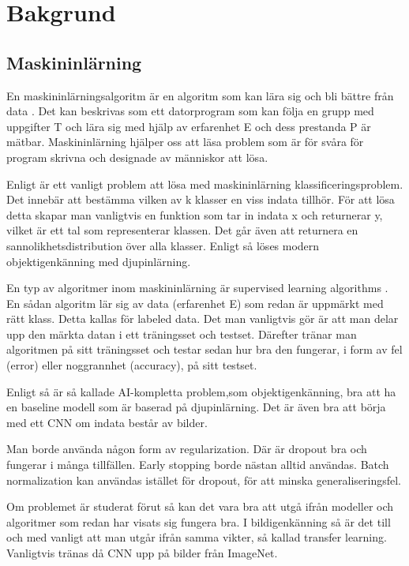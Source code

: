 \documentclass{kththesis}
\begin{document}
\chapter{Bakgrund}
  \section{Maskininlärning}
  En maskininlärningsalgoritm är en algoritm som kan lära sig och bli bättre från data \parencite{Goodfellow-et-al-2016}. Det kan beskrivas som ett datorprogram som kan följa en grupp med uppgifter T och lära sig med hjälp av erfarenhet E och dess prestanda P är mätbar. Maskininlärning hjälper oss att läsa problem som är för svåra för program skrivna och designade av människor att lösa. 

  Enligt \cite{Goodfellow-et-al-2016} är ett vanligt problem att lösa med maskininlärning klassificeringsproblem. Det innebär att bestämma vilken av k klasser en viss indata tillhör. För att lösa detta skapar man vanligtvis en funktion som tar in indata x och returnerar y, vilket är ett tal som representerar klassen. Det går även att returnera en sannolikhetsdistribution över alla klasser. Enligt \cite{Goodfellow-et-al-2016} så löses modern objektigenkänning med djupinlärning.

  En typ av algoritmer inom maskininlärning är supervised learning algorithms \parencite{Goodfellow-et-al-2016}. En sådan algoritm lär sig av data (erfarenhet E) som redan är uppmärkt med rätt klass. Detta kallas för labeled data. Det man vanligtvis gör är att man delar upp den märkta datan i ett träningsset och testset. Därefter tränar man algoritmen på sitt träningsset och testar sedan hur bra den fungerar, i form av fel (error) eller noggrannhet (accuracy), på sitt testset.

  Enligt \parencite{Goodfellow-et-al-2016} så är så kallade AI-kompletta problem,som objektigenkänning, bra att ha en baseline modell som är baserad på djupinlärning. Det är även bra att börja med ett CNN om indata består av bilder. 

  Man borde använda någon form av regularization. Där är dropout bra och fungerar i många tillfällen. Early stopping borde nästan alltid användas. Batch normalization kan användas istället för dropout, för att minska generaliseringsfel. 

  Om problemet är studerat förut så kan det vara bra att utgå ifrån modeller och algoritmer som redan har visats sig fungera bra. I bildigenkänning så är det till och med vanligt att man utgår ifrån samma vikter, så kallad transfer learning. Vanligtvis tränas då CNN upp på bilder från ImageNet. 
\end{document}
